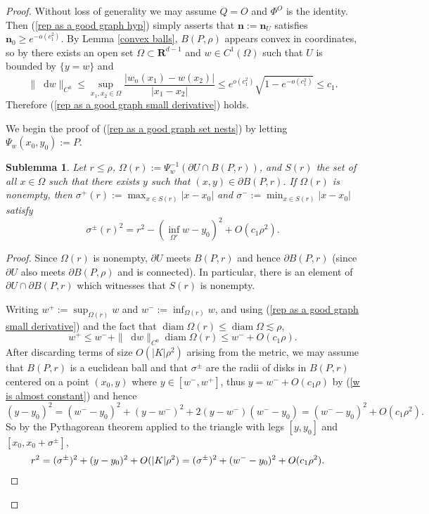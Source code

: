 \documentclass[reqno,11pt]{amsart}
\newcommand{\RR}{\mathbf{R}}
\DeclareMathOperator{\diam}{diam}
\newcommand*\dif{\mathop{}\!\mathrm{d}}
\newcommand{\normal}{\mathbf n}
\newtheorem{sublemma}[theorem]{Sublemma}
\theoremstyle{definition}
\numberwithin{equation}{section}
\begin{document}
\begin{proof}
Without loss of generality we may assume $Q = O$ and $\Phi^O$ is the identity. Then (\ref{rep as a good graph hyp}) simply asserts that $\normal := \normal_U$ satisfies $\normal_0 \geq e^{-o(c_1^2)}$.
By Lemma \ref{convex balls}, $B(P, \rho)$ appears convex in coordinates, so by \cite[Theorem 4.8]{Giusti77} there exists an open set $\Omega \subset \RR^{d - 1}$ and $w \in C^1(\Omega)$ such that $U$ is bounded by $\{y = w\}$ and
$$\|\dif w\|_{C^0} \leq \sup_{x_1, x_2 \in \Omega} \frac{|w_n(x_1) - w(x_2)|}{|x_1 - x_2|} \leq e^{o(c_1^2)}\sqrt{1 - e^{-o(c_1^2)}} \leq c_1.$$
Therefore (\ref{rep as a good graph small derivative}) holds.

We begin the proof of (\ref{rep as a good graph set nests}) by letting $\Psi_w(x_0, y_0) := P$.

\begin{sublemma}
Let $r \leq \rho$, $\Omega(r) := \Psi_w^{-1}(\partial U \cap B(P, r))$, and $S(r)$ the set of all $x \in \Omega$ such that there exists $y$ such that $(x, y) \in \partial B(P, r)$.
If $\Omega(r)$ is nonempty, then $\sigma^+(r) := \max_{x \in S(r)} |x - x_0|$ and $\sigma^- := \min_{x \in S(r)} |x - x_0|$ satisfy
$$\sigma^\pm(r)^2 = r^2 - (\inf_{\Omega'} w - y_0)^2 + O(c_1 \rho^2).$$
\end{sublemma}
\begin{proof}
Since $\Omega(r)$ is nonempty, $\partial U$ meets $B(P, r)$ and hence $\partial B(P, r)$ (since $\partial U$ also meets $\partial B(P, \rho)$ and is connected).
In particular, there is an element of $\partial U \cap \partial B(P, r)$ which witnesses that $S(r)$ is nonempty.

Writing $w^+ := \sup_{\Omega(r)} w$ and $w^- := \inf_{\Omega(r)} w$, and using (\ref{rep as a good graph small derivative}) and the fact that $\diam \Omega(r) \leq \diam \Omega \lesssim \rho$,
\begin{equation}\label{w is almost constant}
w^+ \leq w^- + \|\dif w\|_{C^0} \diam \Omega(r) \leq w^- + O(c_1 \rho).
\end{equation}
After discarding terms of size $O(|K| \rho^2)$ arising from the metric, we may assume that $B(P, r)$ is a euclidean ball and that $\sigma^\pm$ are the radii of disks in $B(P, r)$ centered on a point $(x_0, y)$ where $y \in [w^-, w^+]$, thus $y = w^- + O(c_1 \rho)$ by (\ref{w is almost constant}) and hence
$$(y - y_0)^2 = (w^- - y_0)^2 + (y - w^-)^2 + 2(y - w^-)(w^- - y_0) = (w^- - y_0)^2 + O(c_1 \rho^2).$$
So by the Pythagorean theorem applied to the triangle with legs $[y, y_0]$ and $[x_0, x_0 + \sigma^\pm]$,
\begin{align*}
r^2 &= (\sigma^\pm)^2 + (y - y_0)^2 + O(|K| \rho^2) = (\sigma^\pm)^2 + (w^- - y_0)^2 + O(c_1 \rho^2). \qedhere
\end{align*}
\end{proof}


\end{proof}
\end{document}
